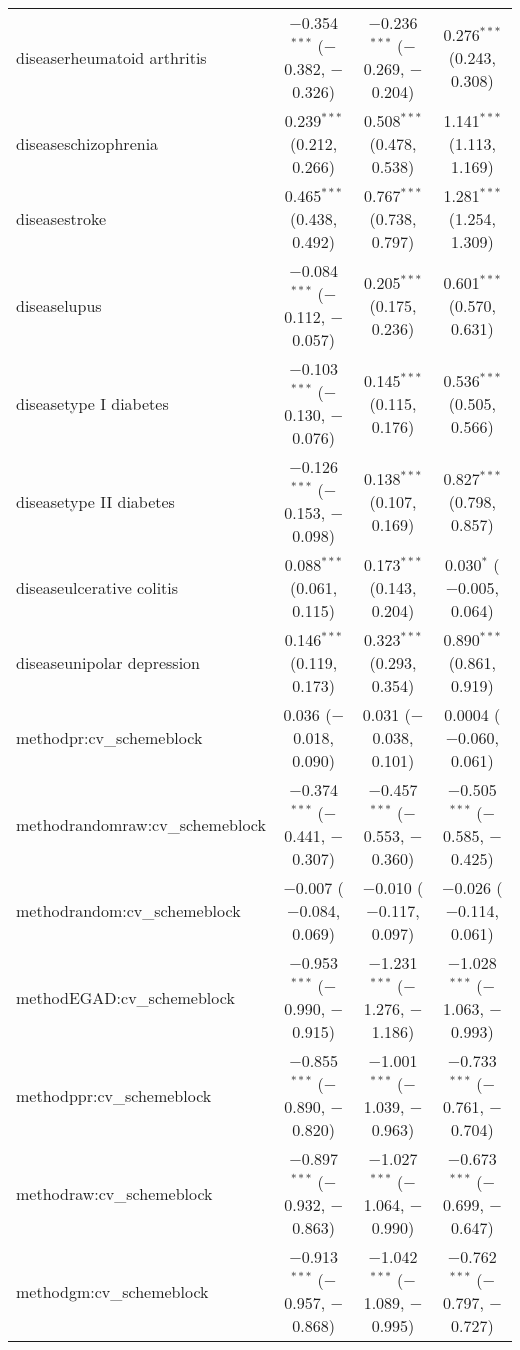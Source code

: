 \begin{table}[!htbp]
\begin{tabular}{@{\extracolsep{5pt}}lccc}
  diseaserheumatoid arthritis & $-$0.354$^{***}$ ($-$0.382, $-$0.326) & $-$0.236$^{***}$ ($-$0.269, $-$0.204) & 0.276$^{***}$ (0.243, 0.308) \\ 
  diseaseschizophrenia & 0.239$^{***}$ (0.212, 0.266) & 0.508$^{***}$ (0.478, 0.538) & 1.141$^{***}$ (1.113, 1.169) \\ 
  diseasestroke & 0.465$^{***}$ (0.438, 0.492) & 0.767$^{***}$ (0.738, 0.797) & 1.281$^{***}$ (1.254, 1.309) \\ 
  diseaselupus & $-$0.084$^{***}$ ($-$0.112, $-$0.057) & 0.205$^{***}$ (0.175, 0.236) & 0.601$^{***}$ (0.570, 0.631) \\ 
  diseasetype I diabetes & $-$0.103$^{***}$ ($-$0.130, $-$0.076) & 0.145$^{***}$ (0.115, 0.176) & 0.536$^{***}$ (0.505, 0.566) \\ 
  diseasetype II diabetes & $-$0.126$^{***}$ ($-$0.153, $-$0.098) & 0.138$^{***}$ (0.107, 0.169) & 0.827$^{***}$ (0.798, 0.857) \\ 
  diseaseulcerative colitis & 0.088$^{***}$ (0.061, 0.115) & 0.173$^{***}$ (0.143, 0.204) & 0.030$^{*}$ ($-$0.005, 0.064) \\ 
  diseaseunipolar depression & 0.146$^{***}$ (0.119, 0.173) & 0.323$^{***}$ (0.293, 0.354) & 0.890$^{***}$ (0.861, 0.919) \\ 
  methodpr:cv\_schemeblock & 0.036 ($-$0.018, 0.090) & 0.031 ($-$0.038, 0.101) & 0.0004 ($-$0.060, 0.061) \\ 
  methodrandomraw:cv\_schemeblock & $-$0.374$^{***}$ ($-$0.441, $-$0.307) & $-$0.457$^{***}$ ($-$0.553, $-$0.360) & $-$0.505$^{***}$ ($-$0.585, $-$0.425) \\ 
  methodrandom:cv\_schemeblock & $-$0.007 ($-$0.084, 0.069) & $-$0.010 ($-$0.117, 0.097) & $-$0.026 ($-$0.114, 0.061) \\ 
  methodEGAD:cv\_schemeblock & $-$0.953$^{***}$ ($-$0.990, $-$0.915) & $-$1.231$^{***}$ ($-$1.276, $-$1.186) & $-$1.028$^{***}$ ($-$1.063, $-$0.993) \\ 
  methodppr:cv\_schemeblock & $-$0.855$^{***}$ ($-$0.890, $-$0.820) & $-$1.001$^{***}$ ($-$1.039, $-$0.963) & $-$0.733$^{***}$ ($-$0.761, $-$0.704) \\ 
  methodraw:cv\_schemeblock & $-$0.897$^{***}$ ($-$0.932, $-$0.863) & $-$1.027$^{***}$ ($-$1.064, $-$0.990) & $-$0.673$^{***}$ ($-$0.699, $-$0.647) \\ 
  methodgm:cv\_schemeblock & $-$0.913$^{***}$ ($-$0.957, $-$0.868) & $-$1.042$^{***}$ ($-$1.089, $-$0.995) & $-$0.762$^{***}$ ($-$0.797, $-$0.727) \\ 

\end{tabular}
\end{table}
